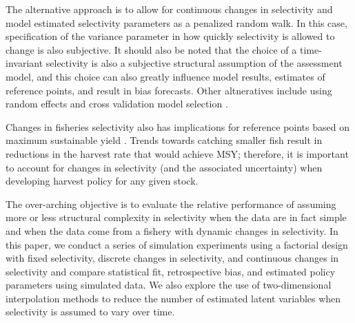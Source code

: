 \documentclass[review,letterpaper,10pt,authoryear]{elsarticle}
\begin{document}
The alternative approach is to allow for continuous changes in selectivity and model estimated selectivity parameters as a penalized random walk. In this case, specification of the variance parameter in how quickly selectivity is allowed to change is also subjective.  It should also be noted that the choice of a time-invariant selectivity is also a subjective structural assumption of the assessment model, and this choice can also greatly influence model results, estimates of reference points, and result in bias forecasts.  Other altneratives include using random effects \citep[see][]{mantyniemi2013integrated}  and cross validation model selection \citep[see][]{maunder2011using}.



Changes in fisheries selectivity also has implications for reference points based on maximum sustainable yield \citep[MSY,][]{beverton1993dynamics}.  Trends towards catching smaller fish result in reductions in the harvest rate that would achieve MSY; therefore, it is important to account for changes in selectivity (and the associated uncertainty) when developing harvest policy for any given stock.

The over-arching objective is to evaluate the relative performance of assuming more or less structural complexity in selectivity when the data are in fact simple and when the data come from a fishery with dynamic changes in selectivity.  In this paper, we conduct a series of simulation experiments using a factorial design with fixed selectivity, discrete changes in selectivity, and continuous changes in selectivity and compare statistical fit, retrospective bias, and estimated policy parameters using simulated data. We also explore the use of two-dimensional interpolation methods to reduce the number of estimated latent variables when selectivity is assumed to vary over time.


\end{document}
